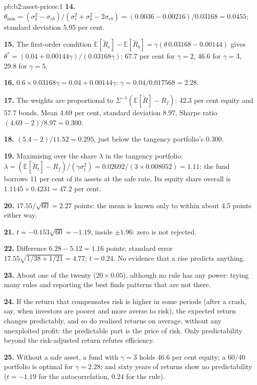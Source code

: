 \begin{solution}{pb:b2:asset-prices:1}
\textbf{14.} $\theta_{\min} = (\sigma_b^2 - \sigma_{eb})/(\sigma_e^2 + \sigma_b^2 - 2\sigma_{eb}) =
(0.0036 - 0.00216)/0.03168 = 0.0455$; standard deviation 5.95 per cent.

\textbf{15.} The first-order condition $\mathbb{E}[\tilde R_e] - \mathbb{E}[\tilde R_b] =
\gamma(\theta\,0.03168 - 0.00144)$ gives $\theta^{*} = (0.04 + 0.00144\gamma)/(0.03168\gamma)$: 67.7 per
cent for $\gamma = 2$, 46.6 for $\gamma = 3$, 29.8 for $\gamma = 5$.

\textbf{16.} $0.6 \times 0.03168\gamma = 0.04 + 0.00144\gamma$: $\gamma = 0.04/0.017568 = 2.28$.

\textbf{17.} The weights are proportional to $\Sigma^{-1}(\mathbb{E}[\tilde R] - R_f)$: 42.3 per cent
equity and 57.7 bonds. Mean 4.69 per cent, standard deviation 8.97, Sharpe ratio $(4.69 - 2)/8.97 =
0.300$.

\textbf{18.} $(5.4 - 2)/11.52 = 0.295$, just below the tangency portfolio's $0.300$.

\textbf{19.} Maximising over the share $\lambda$ in the tangency portfolio: $\lambda =
(\mathbb{E}[\tilde R_t] - R_f)/(\gamma\sigma_t^2) = 0.02692/(3 \times 0.008052) = 1.11$: the fund
borrows 11 per cent of its assets at the safe rate. Its equity share overall is $1.1145 \times 0.4231 =
47.2$ per cent.

\textbf{20.} $17.55/\sqrt{60} = 2.27$ points: the mean is known only to within about 4.5 points either
way.

\textbf{21.} $t = -0.153\sqrt{60} = -1.19$, inside $\pm 1.96$: zero is not rejected.

\textbf{22.} Difference $6.28 - 5.12 = 1.16$ points; standard error $17.55\sqrt{1/38 + 1/21} = 4.77$;
$t = 0.24$. No evidence that a rise predicts anything.

\textbf{23.} About one of the twenty ($20 \times 0.05$), although no rule has any power: trying many
rules and reporting the best finds patterns that are not there.

\textbf{24.} If the return that compensates risk is higher in some periods (after a crash, say, when
investors are poorer and more averse to risk), the expected return changes predictably, and so do
realised returns on average, without any unexploited profit: the predictable part is the price of
risk. Only predictability beyond the risk-adjusted return refutes efficiency.

\textbf{25.} Without a safe asset, a fund with $\gamma = 3$ holds 46.6 per cent equity; a 60/40
portfolio is optimal for $\gamma = 2.28$; and sixty years of returns show no predictability ($t =
-1.19$ for the autocorrelation, $0.24$ for the rule).
\end{solution}
